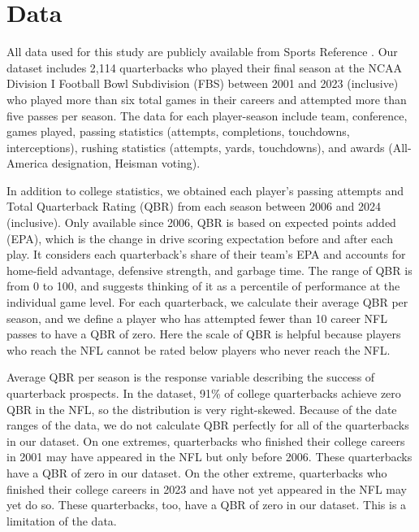\documentclass{article}
\begin{document}
\section{Data}
\label{sec:data}

All data used for this study are publicly available from Sports Reference \citep{sports_reference_sports_2025}. Our dataset includes 2,114 quarterbacks who played their final season at the NCAA Division I Football Bowl Subdivision (FBS) between 2001 and 2023 (inclusive) who played more than six total games in their careers and attempted more than five passes per season. The data for each player-season include team, conference, games played, passing statistics (attempts, completions, touchdowns, interceptions), rushing statistics (attempts, yards, touchdowns), and awards (All-America designation, Heisman voting).

In addition to college statistics, we obtained each player's passing attempts and Total Quarterback Rating (QBR) \citep{burke_how_2016} from each season between 2006 and 2024 (inclusive). Only available since 2006, QBR is based on expected points added (EPA), which is the change in drive scoring expectation before and after each play. It considers each quarterback's share of their team's EPA and accounts for home-field advantage, defensive strength, and garbage time. The range of QBR is from 0 to 100, and \citet{burke_how_2016} suggests thinking of it as a percentile of performance at the individual game level. For each quarterback, we calculate their average QBR per season, and we define a player who has attempted fewer than 10 career NFL passes to have a QBR of zero. Here the scale of QBR is helpful because players who reach the NFL cannot be rated below players who never reach the NFL.

Average QBR per season is the response variable describing the success of quarterback prospects. In the dataset, 91\% of college quarterbacks achieve zero QBR in the NFL, so the distribution is very right-skewed. Because of the date ranges of the data, we do not calculate QBR perfectly for all of the quarterbacks in our dataset. On one extremes, quarterbacks who finished their college careers in 2001 may have appeared in the NFL but only before 2006. These quarterbacks have a QBR of zero in our dataset. On the other extreme, quarterbacks who finished their college careers in 2023 and have not yet appeared in the NFL may yet do so. These quarterbacks, too, have a QBR of zero in our dataset. This is a limitation of the data.
\end{document}

